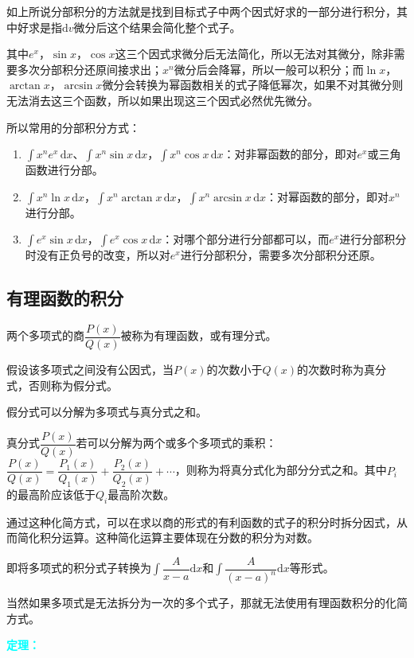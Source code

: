 \documentclass[UTF8, 12pt]{ctexart}
\begin{document}
如上所说分部积分的方法就是找到目标式子中两个因式好求的一部分进行积分，其中好求是指$\textrm{d}v$微分后这个结果会简化整个式子。

其中$e^x$，$\sin x$，$\cos x$这三个因式求微分后无法简化，所以无法对其微分，除非需要多次分部积分还原间接求出；$x^n$微分后会降幂，所以一般可以积分；而$\ln x$，$\arctan x$，$\arcsin x$微分会转换为幂函数相关的式子降低幂次，如果不对其微分则无法消去这三个函数，所以如果出现这三个因式必然优先微分。

所以常用的分部积分方式：

\begin{enumerate}
    \item $\int x^ne^x\,\textrm{d}x$、$\int x^n\sin x\,\textrm{d}x$，$\int x^n\cos x\,\textrm{d}x$：对非幂函数的部分，即对$e^x$或三角函数进行分部。
    \item $\int x^n\ln x\,\textrm{d}x$，$\int x^n\arctan x\,\textrm{d}x$，$\int x^n\arcsin x\,\textrm{d}x$：对幂函数的部分，即对$x^n$进行分部。
    \item $\int e^x\sin x\,\textrm{d}x$，$\int e^x\cos x\,\textrm{d}x$：对哪个部分进行分部都可以，而$e^x$进行分部积分时没有正负号的改变，所以对$e^x$进行分部积分，需要多次分部积分还原。
\end{enumerate}

\subsection{有理函数的积分}

两个多项式的商$\dfrac{P(x)}{Q(x)}$被称为有理函数，或有理分式。

假设该多项式之间没有公因式，当$P(x)$的次数小于$Q(x)$的次数时称为真分式，否则称为假分式。

假分式可以分解为多项式与真分式之和。

真分式$\dfrac{P(x)}{Q(x)}$若可以分解为两个或多个多项式的乘积：$\dfrac{P(x)}{Q(x)}=\dfrac{P_1(x)}{Q_1(x)}+\dfrac{P_2(x)}{Q_2(x)}+\cdots$，则称为将真分式化为部分分式之和。其中$P_i$的最高阶应该低于$Q_i$最高阶次数。

通过这种化简方式，可以在求以商的形式的有利函数的式子的积分时拆分因式，从而简化积分运算。这种简化运算主要体现在分数的积分为对数。

即将多项式的积分式子转换为$\displaystyle{\int\dfrac{A}{x-a}\textrm{d}x}$和$\displaystyle{\int\dfrac{A}{(x-a)^n}\textrm{d}x}$等形式。

当然如果多项式是无法拆分为一次的多个式子，那就无法使用有理函数积分的化简方式。

\textcolor{aqua}{\textbf{定理：}}
\end{document}
